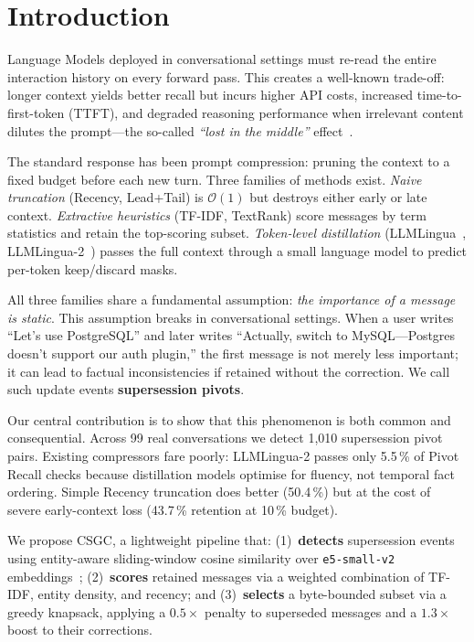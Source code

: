 \documentclass[conference]{IEEEtran}
\newcommand{\csgc}{\textsc{CSGC}}
\begin{document}
\section{Introduction}
\label{sec:intro}

 Language Models deployed in conversational settings
must re-read the entire interaction history on every forward pass. This
creates a well-known trade-off: longer context yields better recall but
incurs higher API costs, increased time-to-first-token (TTFT), and degraded
reasoning performance when irrelevant content dilutes the
prompt---the so-called \emph{``lost in the middle''} effect~\cite{liu2023lostmiddle}.

The standard response has been prompt compression: pruning the context to a
fixed budget before each new turn. Three families of methods exist.
\emph{Naive truncation} (Recency, Lead+Tail) is $\mathcal{O}(1)$ but
destroys either early or late context. \emph{Extractive heuristics} (TF-IDF,
TextRank) score messages by term statistics and retain the top-scoring subset.
\emph{Token-level distillation} (LLMLingua~\cite{jiang2023llmlingua},
LLMLingua-2~\cite{pan2024llmlingua2}) passes the full context through a
small language model to predict per-token keep/discard masks.

All three families share a fundamental assumption: \emph{the importance of a
message is static}. This assumption breaks in conversational settings. When a
user writes ``Let's use PostgreSQL'' and later writes ``Actually, switch to
MySQL---Postgres doesn't support our auth plugin,'' the first message is not
merely less important; it can lead to factual inconsistencies if retained without
the correction. We call such update events \textbf{supersession pivots}.

Our central contribution is to show that this phenomenon is both common and
consequential. Across 99 real conversations we detect 1,010 supersession
pivot pairs. Existing compressors fare poorly: LLMLingua-2 passes only
5.5\,\% of Pivot Recall checks because distillation models optimise for
fluency, not temporal fact ordering. Simple Recency truncation does better
(50.4\,\%) but at the cost of severe early-context loss (43.7\,\%
retention at 10\,\% budget).

We propose \csgc{}, a lightweight pipeline that: (1)~\textbf{detects}
supersession events using entity-aware sliding-window cosine similarity over
\texttt{e5-small-v2} embeddings~\cite{wang2024e5}; (2)~\textbf{scores}
retained messages via a weighted combination of TF-IDF, entity density, and
recency; and (3)~\textbf{selects} a byte-bounded subset via a greedy
knapsack, applying a $0.5\times$ penalty to superseded messages and a
$1.3\times$ boost to their corrections.
\end{document}
